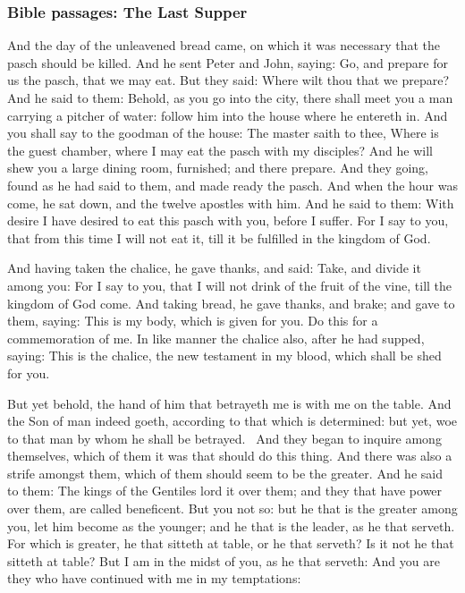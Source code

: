 \subsubsection*{Bible passages: The Last Supper}
\begin{multicols}{2}\small
And the day of the unleavened bread came, on which it was necessary that the pasch should be killed. And he sent Peter
and John, saying: Go, and prepare for us the pasch, that we may eat. But they said: Where wilt thou that we prepare?
And he said to them: Behold, as you go into the city, there shall meet you a man carrying a pitcher of water: follow
him into the house where he entereth in. And you shall say to the goodman of the house: The master saith to thee, Where
is the guest chamber, where I may eat the pasch with my disciples? And he will shew you a large dining room, furnished;
and there prepare. And they going, found as he had said to them, and made ready the pasch. And when the hour was come,
he sat down, and the twelve apostles with him. And he said to them: With desire I have desired to eat this pasch with
you, before I suffer. For I say to you, that from this time I will not eat it, till it be fulfilled in the kingdom of
God.

And having taken the chalice, he gave thanks, and said: Take, and divide it among you: For I say to you, that I will not
drink of the fruit of the vine, till the kingdom of God come. And taking bread, he gave thanks, and brake; and gave to
them, saying: This is my body, which is given for you. Do this for a commemoration of me. In like manner the chalice
also, after he had supped, saying: This is the chalice, the new testament in my blood, which shall be shed for you.

But yet behold, the hand of him that betrayeth me is with me on the table. And the Son of man indeed goeth, according to
that which is determined: but yet, woe to that man by whom he shall be betrayed.  And they began to inquire among
themselves, which of them it was that should do this thing. And there was also a strife amongst them, which of them
should seem to be the greater. And he said to them: The kings of the Gentiles lord it over them; and they that have
power over them, are called beneficent. But you not so: but he that is the greater among you, let him become as the
younger; and he that is the leader, as he that serveth. For which is greater, he that sitteth at table, or he that
serveth? Is it not he that sitteth at table? But I am in the midst of you, as he that serveth: And you are they who
have continued with me in my temptations:


\end{multicols}
